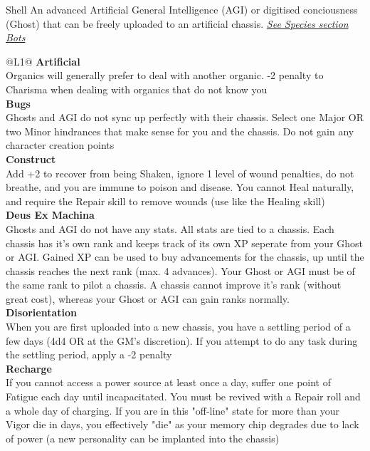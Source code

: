 \begin{genericsection}{Shell}
  An advanced Artificial General Intelligence (AGI) or digitised conciousness (Ghost) that can be freely uploaded to an artificial chassis. \textit{\hyperref[sec:specie-bots]{See Species section Bots}}
\end{genericsection}
\begin{redtable}{\linewidth}{@{}L{1}@{}}
  \textbf{Artificial}\\
  Organics will generally prefer to deal with another organic. -2 penalty to Charisma when dealing with organics that do not know you\\
  \textbf{Bugs}\\
  Ghosts and AGI do not sync up perfectly with their chassis. Select one Major OR two Minor hindrances that make sense for you and the chassis. Do not gain any character creation points\\
  \textbf{Construct}\\
  Add +2 to recover from being Shaken, ignore 1 level of wound penalties, do not breathe, and you are immune to poison and disease. You cannot Heal naturally, and require the Repair skill to remove wounds (use like the Healing skill)\\
  \textbf{Deus Ex Machina}\\
  Ghosts and AGI do not have any stats. All stats are tied to a chassis. Each chassis has it's own rank and keeps track of its own XP seperate from your Ghost or AGI. Gained XP can be used to buy advancements for the chassis, up until the chassis reaches the next rank (max. 4 advances). Your Ghost or AGI must be of the same rank to pilot a chassis. A chassis cannot improve it's rank (without great cost), whereas your Ghost or AGI can gain ranks normally.\\
  \textbf{Disorientation}\\
  When you are first uploaded into a new chassis, you have a settling period of a few days (4d4 OR at the GM's discretion). If you attempt to do any task during the settling period, apply a -2 penalty\\
  \textbf{Recharge}\\
  If you cannot access a power source at least once a day, suffer one point of Fatigue each day until incapacitated. You must be revived with a Repair roll and a whole day of charging. If you are in this "off-line" state for more than your Vigor die in days, you effectively "die" as your memory chip degrades due to lack of power (a new personality can be implanted into the chassis)\\
\end{redtable}
  
